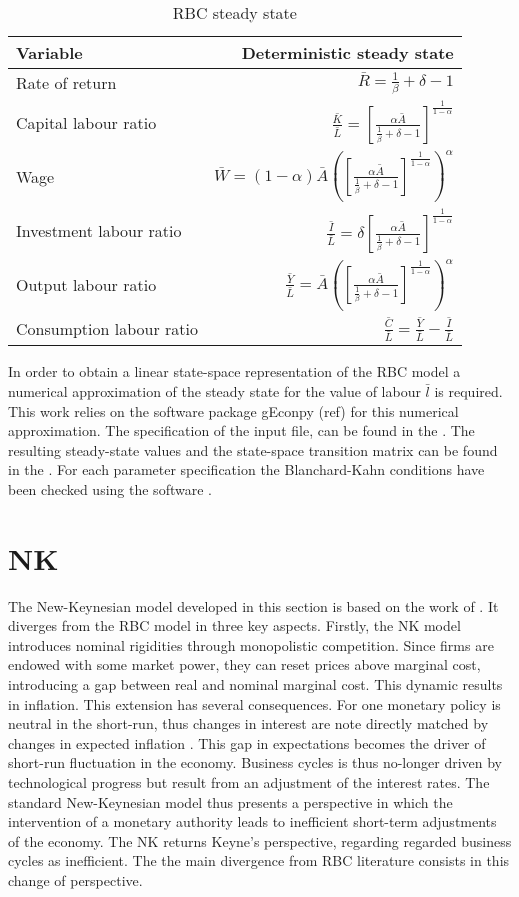 \documentclass[12pt,a4paper,english]{article} %
\newcommand{\Rss}{\frac{1}{\beta} + \delta - 1}
\newcommand{\Ass}{\bar{A}}
\newcommand{\KLss}{\left[ \frac{\alpha \Ass}{\Rss} \right]^{\frac{1}{1-\alpha}}}
\let\oldsection\section
\renewcommand\section{\clearpage\oldsection}
\begin{document}
	\begin{table}[H]
		\fontsize{9pt}{9pt}\selectfont
		\centering
		\caption{RBC steady state}
		\begin{tabular}{lr}
			\textbf{Variable} & \textbf{Deterministic steady state}\\
			\hline 
			Rate of return & $\bar{R} = \Rss$ \\
			Capital labour ratio & $\frac{\bar{K}}{\bar{L}} = \KLss$ \\
			Wage & $\bar{W} = (1 - \alpha) \Ass \left(\KLss\right)^\alpha$ \\
			Investment labour ratio & $\frac{\bar{I}}{\bar{L}} = \delta \KLss$ \\
			Output labour ratio & $\frac{\bar{Y}}{\bar{L}} = \Ass \left(\KLss\right)^\alpha$ \\
			Consumption labour ratio & $\frac{\bar{C}}{\bar{L}} = \frac{\bar{Y}}{\bar{L}} - \frac{\bar{I}}{\bar{L}}$ \\
		\end{tabular}
	\end{table}

	In order to obtain a linear state-space representation of the RBC model a numerical approximation of the steady state for the value of labour $\bar{l}$ is required. This work relies on the software package gEconpy (ref) for this numerical approximation. The specification of the input file, can be found in the . The resulting steady-state values and the state-space transition matrix can be found in the . For each parameter specification the Blanchard-Kahn conditions have been checked using the software \cite{blanchard_solution_1980}.

	\section{NK} \label{sec:NK}
	The New-Keynesian model developed in this section is based on the work of \cite{gali_monetary_2008}. It diverges from the RBC model in three key aspects.
	Firstly, the NK model introduces nominal rigidities through monopolistic competition. Since firms are endowed with some market power, they can reset prices above marginal cost, introducing a gap between real and nominal marginal cost. This dynamic results in inflation. This extension has several consequences. For one monetary policy is neutral in the short-run, thus changes in interest are note directly matched by changes in expected inflation \cite{gali_monetary_2008}. This gap in expectations becomes the driver of short-run fluctuation in the economy. Business cycles is thus no-longer driven by technological progress but result from an adjustment of the interest rates. The standard New-Keynesian model thus presents a perspective in which the intervention of a monetary authority leads to inefficient short-term adjustments of the economy. The NK returns Keyne's perspective, regarding regarded business cycles as inefficient. The the main divergence from RBC literature consists in this change of perspective.
	
\end{document}
